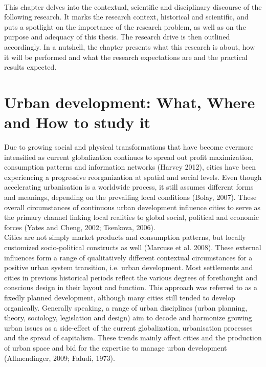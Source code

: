 \documentclass[11pt]{report}
\begin{document}
\\
This chapter delves into the contextual, scientific and disciplinary discourse of the following research. It marks the research context, historical and scientific, and puts a spotlight on the importance of the research problem, as well as on the purpose and adequacy of this thesis. The research drive is then outlined accordingly. In a nutshell, the chapter presents what this research is about, how it will be performed and what the research expectations are and the practical results expected. 

\section{Urban development: What, Where and How to study it}

Due to growing social and physical transformations that have become evermore intensified as current globalization continues to spread out profit maximization, consumption patterns and information networks (Harvey 2012), cities have been experiencing a progressive reorganization at spatial and social levels. Even though accelerating urbanisation is a worldwide process, it still assumes different forms and meanings, depending on the prevailing local conditions (Bolay, 2007). These overall circumstances of continuous urban development influence cities to serve as the primary channel linking local realities to global social, political and economic forces (Yates and Cheng, 2002; Tsenkova, 2006).
\\
Cities are not simply market products and consumption patterns, but locally customized socio-political constructs as well (Marcuse et al. 2008). These external influences form a range of qualitatively different contextual circumstances for a positive urban system transition, i.e. urban development. Most settlements and cities in previous historical periods reflect the various degrees of forethought and conscious design in their layout and function. This approach was referred to as a fixedly planned development, although many cities still tended to develop organically. Generally speaking, a range of urban disciplines (urban planning, theory, sociology, legislation and design) aim to decode and harmonize growing urban issues as a side-effect of the current globalization, urbanisation processes and the spread of capitalism. These trends mainly affect cities and the production of urban space and bid for the expertise to manage urban development (Allmendinger, 2009; Faludi, 1973). 
\\
\end{document}
